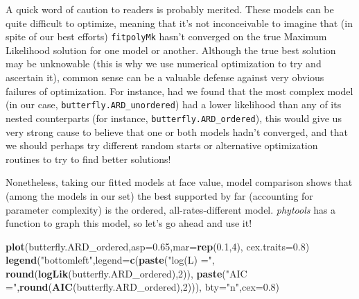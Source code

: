 \documentclass[fleqn,10pt,lineno]{wlpeerj} %
\newenvironment{Shaded}{\begin{snugshade}}{\end{snugshade}}
\newcommand{\AttributeTok}[1]{\textcolor[rgb]{0.13,0.29,0.53}{#1}}
\newcommand{\DecValTok}[1]{\textcolor[rgb]{0.00,0.00,0.81}{#1}}
\newcommand{\FloatTok}[1]{\textcolor[rgb]{0.00,0.00,0.81}{#1}}
\newcommand{\FunctionTok}[1]{\textcolor[rgb]{0.13,0.29,0.53}{\textbf{#1}}}
\newcommand{\NormalTok}[1]{#1}
\newcommand{\StringTok}[1]{\textcolor[rgb]{0.31,0.60,0.02}{#1}}
\begin{document}
A quick word of caution to readers is probably merited. These models can be quite difficult to optimize, meaning that it's not inconceivable to imagine that (in spite of our best efforts) \texttt{fitpolyMk} hasn't converged on the true Maximum Likelihood solution for one model or another. Although the true best solution may be unknowable (this is why we use numerical optimization to try and ascertain it), common sense can be a valuable defense against very obvious failures of optimization. For instance, had we found that the most complex model (in our case, \texttt{butterfly.ARD\_unordered}) had a lower likelihood than any of its nested counterparts (for instance, \texttt{butterfly.ARD\_ordered}), this would give us very strong cause to believe that one or both models hadn't converged, and that we should perhaps try different random starts or alternative optimization routines to try to find better solutions!

Nonetheless, taking our fitted models at face value, model comparison shows that (among the models in our set) the best supported by far (accounting for parameter complexity) is the ordered, all-rates-different model. \emph{phytools} has a function to graph this model, so let's go ahead and use it!

\begin{Shaded}
\begin{Highlighting}[]
\FunctionTok{plot}\NormalTok{(butterfly.ARD\_ordered,}\AttributeTok{asp=}\FloatTok{0.65}\NormalTok{,}\AttributeTok{mar=}\FunctionTok{rep}\NormalTok{(}\FloatTok{0.1}\NormalTok{,}\DecValTok{4}\NormalTok{),}
  \AttributeTok{cex.traits=}\FloatTok{0.8}\NormalTok{)}
\FunctionTok{legend}\NormalTok{(}\StringTok{"bottomleft"}\NormalTok{,}\AttributeTok{legend=}\FunctionTok{c}\NormalTok{(}\FunctionTok{paste}\NormalTok{(}\StringTok{"log(L) ="}\NormalTok{,}
  \FunctionTok{round}\NormalTok{(}\FunctionTok{logLik}\NormalTok{(butterfly.ARD\_ordered),}\DecValTok{2}\NormalTok{)),}
  \FunctionTok{paste}\NormalTok{(}\StringTok{"AIC ="}\NormalTok{,}\FunctionTok{round}\NormalTok{(}\FunctionTok{AIC}\NormalTok{(butterfly.ARD\_ordered),}\DecValTok{2}\NormalTok{))),}
  \AttributeTok{bty=}\StringTok{"n"}\NormalTok{,}\AttributeTok{cex=}\FloatTok{0.8}\NormalTok{)}
\end{Highlighting}
\end{Shaded}
\end{document}
